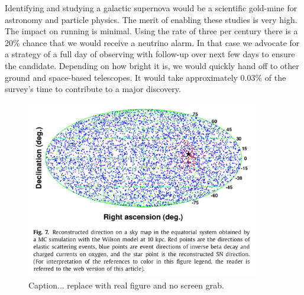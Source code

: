 \documentclass[11pt, letterpaper]{article}
\begin{document}
Identifying and studying a galactic supernova would be a scientific
gold-mine for astronomy and particle physics.  The merit of enabling
these studies is very high. The impact on running is minimal.  Using
the rate of three per century there is a 20\% chance that we would
receive a neutrino alarm. In that case we advocate for a strategy of a
full day of observing with follow-up over next few days to ensure the
candidate.  Depending on how bright it is, we would quickly hand off
to other ground and space-based telescopes.  It would take
approximately 0.03\% of the survey's time to contribute to a major
discovery.

\clearpage

\begin{figure}
  \begin{center}
    \includegraphics[width=4.0in]{SK-realtime-monitor-pointing}
    \caption{Caption... replace with real figure and no screen grab.}
    \label{fig:SK-realtime-monitor-pointing}
  \end{center}
\end{figure}
\end{document}

